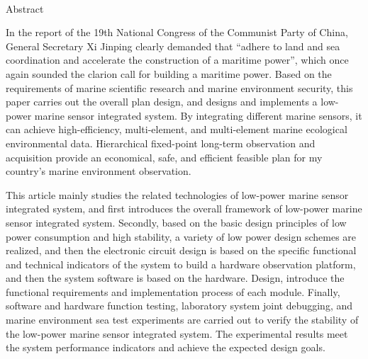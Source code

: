 \newpage

\begin{center}
  {\sanhao[1.5]\heiti\oucetitle\\\vskip7pt Abstract}
\end{center}
{\normalsize\songti

In the report of the 19th National Congress of the Communist Party of China, General Secretary Xi Jinping clearly demanded that “adhere to land and sea coordination and accelerate the construction of a maritime power”, which once again sounded the clarion call for building a maritime power. Based on the requirements of marine scientific research and marine environment security, this paper carries out the overall plan design, and designs and implements a low-power marine sensor integrated system. By integrating different marine sensors, it can achieve high-efficiency, multi-element, and multi-element marine ecological environmental data. Hierarchical fixed-point long-term observation and acquisition provide an economical, safe, and efficient feasible plan for my country's marine environment observation.

This article mainly studies the related technologies of low-power marine sensor integrated system, and first introduces the overall framework of low-power marine sensor integrated system. Secondly, based on the basic design principles of low power consumption and high stability, a variety of low power design schemes are realized, and then the electronic circuit design is based on the specific functional and technical indicators of the system to build a hardware observation platform, and then the system software is based on the hardware. Design, introduce the functional requirements and implementation process of each module. Finally, software and hardware function testing, laboratory system joint debugging, and marine environment sea test experiments are carried out to verify the stability of the low-power marine sensor integrated system. The experimental results meet the system performance indicators and achieve the expected design goals.

}
